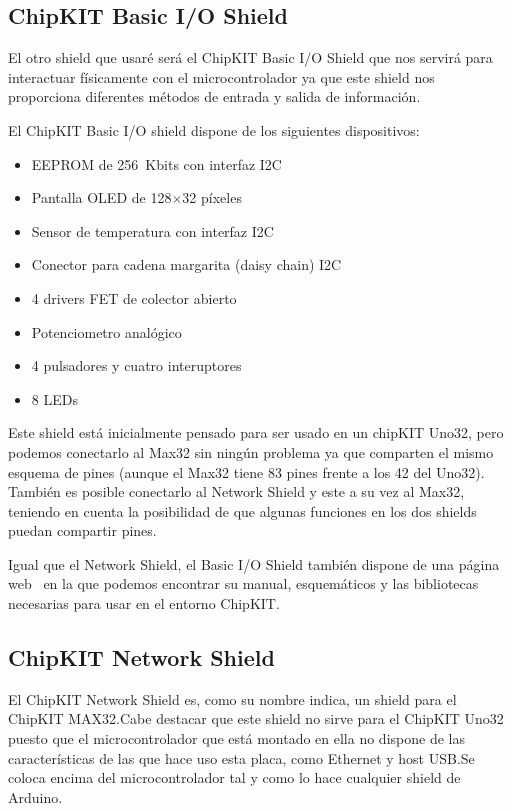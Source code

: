
\subsection{ChipKIT Basic I/O Shield}
El otro shield que usaré será el ChipKIT Basic I/O Shield que nos servirá para interactuar físicamente con el microcontrolador ya que este shield nos proporciona diferentes métodos de entrada y salida de información.


El ChipKIT Basic I/O shield dispone de los siguientes dispositivos:
\begin{itemize}
	\item EEPROM de 256~Kbits con interfaz I2C
	\item Pantalla OLED de 128$\times$32 píxeles
	\item Sensor de temperatura con interfaz I2C
	\item Conector para cadena margarita (daisy chain) I2C
	\item 4 drivers FET de colector abierto
	\item Potenciometro analógico
	\item 4 pulsadores y cuatro interuptores
	\item 8 LEDs
\end{itemize}

Este shield está inicialmente pensado para ser usado en un chipKIT Uno32, pero podemos conectarlo al Max32 sin ningún problema ya que comparten el mismo esquema de pines (aunque el Max32 tiene 83 pines frente a los 42 del Uno32). También es posible conectarlo al Network Shield y este a su vez al Max32, teniendo en cuenta la posibilidad de que algunas funciones en los dos shields puedan compartir pines.

Igual que el Network Shield, el Basic I/O Shield también dispone de una página web~\cite{website:io_shield} en la que podemos encontrar su manual, esquemáticos y las bibliotecas necesarias para usar en el entorno ChipKIT.\@
\subsection{ChipKIT Network Shield}

El ChipKIT Network Shield es, como su nombre indica, un shield para el ChipKIT MAX32.\@ Cabe destacar que este shield no sirve para el ChipKIT Uno32 puesto que el microcontrolador que está montado en ella no dispone de las características de las que hace uso esta placa, como Ethernet y host USB.\@ Se coloca encima del microcontrolador tal y como lo hace cualquier shield de Arduino.


